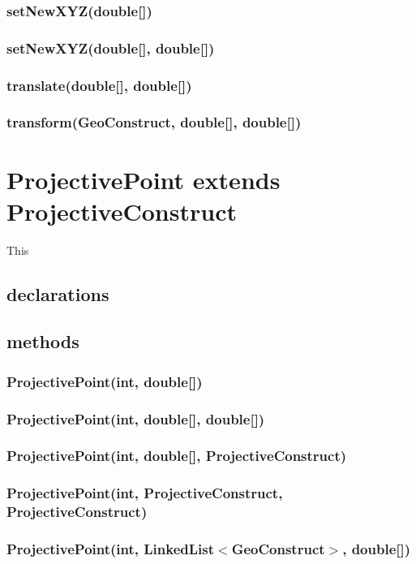 \documentclass[a4paper,10pt]{report}
\begin{document}
\subsubsection{setNewXYZ(double[])}
\subsubsection{setNewXYZ(double[], double[])}
\subsubsection{translate(double[], double[])}
\subsubsection{transform(GeoConstruct, double[], double[])}
\section{ProjectivePoint extends ProjectiveConstruct} This
\subsection{declarations}
\subsubsection{}
\subsection{methods}
\subsubsection{ProjectivePoint(int, double[])}
\subsubsection{ProjectivePoint(int, double[], double[])}
\subsubsection{ProjectivePoint(int, double[], ProjectiveConstruct)}
\subsubsection{ProjectivePoint(int, ProjectiveConstruct, ProjectiveConstruct)}
\subsubsection{ProjectivePoint(int, LinkedList$<$GeoConstruct$>$, double[])}
\end{document}
